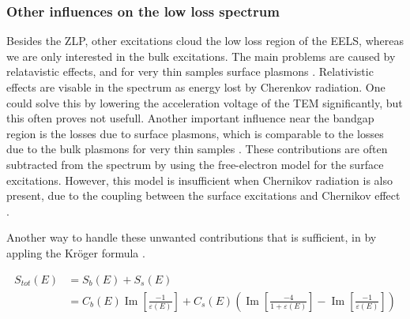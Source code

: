 \subsubsection{Other influences on the low loss spectrum}
Besides the ZLP, other excitations cloud the low loss region of the EELS, whereas we are only interested in the bulk excitations. The main problems are caused by relatavistic effects, and for very thin samples surface plasmons \cite{potapov}. Relativistic effects are visable in the spectrum as energy lost by Cherenkov radiation. One could solve this by lowering the acceleration voltage of the TEM significantly, but this often proves not usefull. Another important influence near the bandgap region is the losses due to surface plasmons, which is comparable to the losses due to the bulk plasmons for very thin samples \cite{potapov}. These contributions are often subtracted from the spectrum by using the free-electron model for the surface excitations. However, this model is insufficient when Chernikov radiation is also present, due to the coupling between the surface excitations and Chernikov effect \cite{potapov}.

Another way to handle these unwanted contributions that is sufficient, in by appling the Kröger formula \cite{potapov,egerton_book}.



\cite{thesis}
\begin{equation}
\begin{aligned}
S_{tot}(E) &= S_{b} (E) + S_s (E)\\
&= C_b(E) \operatorname{Im}\left[\frac{-1}{\varepsilon(E)}\right] + C_s(E)\left(\operatorname{Im}\left[\frac{-4}{1+\varepsilon(E)}\right] - \operatorname{Im}\left[\frac{-1}{\varepsilon(E)}\right]\right) 
\end{aligned}
\end{equation}
